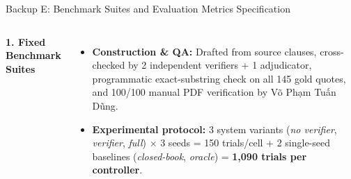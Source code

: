 \documentclass[aspectratio=1610,11pt]{beamer}
\begin{document}
\begin{frame}{Backup E: Benchmark Suites and Evaluation Metrics Specification}
  \begin{columns}[T]
    \scriptsize
    \textbf{1. Fixed Benchmark Suites}
    \vspace{2pt}

    \vspace{4pt}

    \begin{itemize}\scriptsize
      \item \textbf{Construction \& QA:} Drafted from source clauses, cross-checked by 2 independent verifiers + 1 adjudicator, programmatic exact-substring check on all 145 gold quotes, and 100/100 manual PDF verification by Võ Phạm Tuấn Dũng.
      \item \textbf{Experimental protocol:} 3 system variants (\emph{no verifier}, \emph{verifier}, \emph{full}) $\times$ 3 seeds = 150 trials/cell + 2 single-seed baselines (\emph{closed-book}, \emph{oracle}) = \textbf{1,090 trials per controller}.
    \end{itemize}


\end{columns}
\end{frame}
\end{document}
